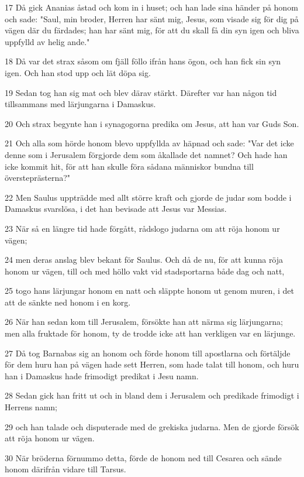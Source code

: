 \par 17 Då gick Ananias åstad och kom in i huset; och han lade sina händer på honom och sade: "Saul, min broder, Herren har sänt mig, Jesus, som visade sig för dig på vägen där du färdades; han har sänt mig, för att du skall få din syn igen och bliva uppfylld av helig ande."
\par 18 Då var det strax såsom om fjäll föllo ifrån hans ögon, och han fick sin syn igen. Och han stod upp och lät döpa sig.
\par 19 Sedan tog han sig mat och blev därav stärkt. Därefter var han någon tid tillsammans med lärjungarna i Damaskus.
\par 20 Och strax begynte han i synagogorna predika om Jesus, att han var Guds Son.
\par 21 Och alla som hörde honom blevo uppfyllda av häpnad och sade: "Var det icke denne som i Jerusalem förgjorde dem som åkallade det namnet? Och hade han icke kommit hit, för att han skulle föra sådana människor bundna till översteprästerna?"
\par 22 Men Saulus uppträdde med allt större kraft och gjorde de judar som bodde i Damaskus svarslösa, i det han bevisade att Jesus var Messias.
\par 23 När så en längre tid hade förgått, rådslogo judarna om att röja honom ur vägen;
\par 24 men deras anslag blev bekant för Saulus. Och då de nu, för att kunna röja honom ur vägen, till och med höllo vakt vid stadsportarna både dag och natt,
\par 25 togo hans lärjungar honom en natt och släppte honom ut genom muren, i det att de sänkte ned honom i en korg.
\par 26 När han sedan kom till Jerusalem, försökte han att närma sig lärjungarna; men alla fruktade för honom, ty de trodde icke att han verkligen var en lärjunge.
\par 27 Då tog Barnabas sig an honom och förde honom till apostlarna och förtäljde för dem huru han på vägen hade sett Herren, som hade talat till honom, och huru han i Damaskus hade frimodigt predikat i Jesu namn.
\par 28 Sedan gick han fritt ut och in bland dem i Jerusalem och predikade frimodigt i Herrens namn;
\par 29 och han talade och disputerade med de grekiska judarna. Men de gjorde försök att röja honom ur vägen.
\par 30 När bröderna förnummo detta, förde de honom ned till Cesarea och sände honom därifrån vidare till Tarsus.
